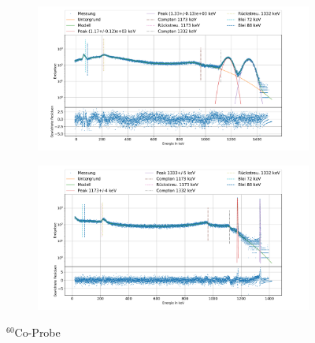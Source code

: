 \documentclass[
	a4paper,
	12pt,
	pagesize,
	ngerman
]{scrartcl}
\begin{document}
\begin{figure}[H]
		\centering
		\begin{subfigure}[c]{\textwidth}
			\centering
			\includegraphics[width= 1 \linewidth]{img/CoNa.pdf}
		\end{subfigure}
		\begin{subfigure}[c]{\textwidth}
			\centering
			\includegraphics[width= 1 \linewidth]{img/CoGe.pdf}
		\end{subfigure}
		\caption{$^{60}$Co-Probe}
		\label{fg_Co}
	\end{figure}
\end{document}
